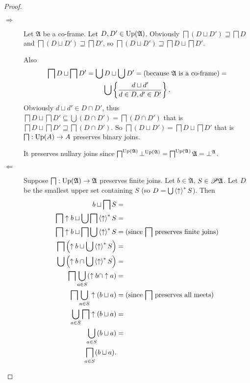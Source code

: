 \begin{proof}
~
\begin{description}
\item [{$\Rightarrow$}] Let $\mathfrak{A}$ be a co-frame. Let $D,D'\in\operatorname{Up}(\mathfrak{A})$.
Obviously $\bigsqcap(D\sqcup D')\sqsupseteq\bigsqcap D$ and $\bigsqcap(D\sqcup D')\sqsupseteq\bigsqcap D'$,
so $\bigsqcap(D\sqcup D')\sqsupseteq\bigsqcap D\sqcup\bigsqcap D'$.


Also 
\begin{multline*}
\bigsqcap D\sqcup\bigsqcap D'=\bigcup D\sqcup\bigcup D'=\text{(because \ensuremath{\mathfrak{A}} is a co-frame)}=\\
\bigcup\left\{ \frac{d\sqcup d'}{d\in D,d'\in D'}\right\}.
\end{multline*}
Obviously $d\sqcup d'\in D\cap D'$, thus $\bigsqcap D\sqcup\bigsqcap D'\subseteq\bigcup(D\cap D')=\bigsqcap(D\cap D')$
that is $\bigsqcap D\sqcup\bigsqcap D'\sqsupseteq\bigsqcap(D\cap D')$.
So $\bigsqcap(D\sqcup D')=\bigsqcap D\sqcup\bigsqcap D'$ that is
$\bigsqcap:\operatorname{Up}(A)\rightarrow A$ preserves binary joins.


It preserves nullary joins since $\bigsqcap^{\operatorname{Up}(\mathfrak{A})}\bot^{\operatorname{Up}(\mathfrak{A})}=\bigsqcap^{\operatorname{Up}(\mathfrak{A})}\mathfrak{A}=\bot^{\mathfrak{A}}$.

\item [{$\Leftarrow$}] Suppose $\bigsqcap:\operatorname{Up}(\mathfrak{A})\rightarrow\mathfrak{A}$
preserves finite joins. Let $b\in\mathfrak{A}$, $S\in\mathscr{P}\mathfrak{A}$.
Let $D$ be the smallest upper set containing $S$ (so $D=\bigcup\left\langle \uparrow\right\rangle ^{\ast}S$).
Then
\begin{align*}
b\sqcup\bigsqcap S & =\\
\bigsqcap\uparrow b\sqcup\bigcup\bigsqcap\left\langle \uparrow\right\rangle ^{\ast}S & =\\
\bigsqcap\uparrow b\sqcup\bigsqcap\bigcup\left\langle \uparrow\right\rangle ^{\ast}S & =\text{(since \ensuremath{\bigsqcap} preserves finite joins)}\\
\bigsqcap\left(\uparrow b\sqcup\bigcup\left\langle \uparrow\right\rangle ^{\ast}S\right) & =\\
\bigcup\left(\uparrow b\cap\bigcup\left\langle \uparrow\right\rangle ^{\ast}S\right) & =\\
\bigsqcap\bigcup_{a\in S}(\uparrow b\cap\uparrow a) & =\\
\bigsqcap\bigcup_{a\in S}\uparrow(b\sqcup a) & =\text{(since \ensuremath{\bigsqcap} preserves all meets)}\\
\bigcup_{a\in S}\bigsqcap\uparrow(b\sqcup a) & =\\
\bigcup_{a\in S}(b\sqcup a) & =\\
\bigsqcap_{a\in S}(b\sqcup a).
\end{align*}

\end{description}
\end{proof}
